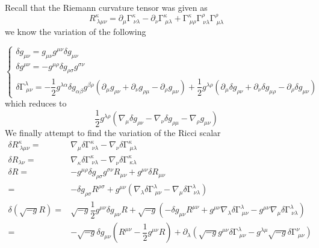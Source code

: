 \begin{recall}
Recall that the Riemann curvature tensor was given as 
\[R^{\kappa }_{\ \lambda \mu \nu }=\partial _{\mu }\mathrm{\Gamma} ^{\kappa }_{\ \nu \lambda }-\partial _{\nu }\mathrm{\Gamma} ^{\kappa }_{\ \mu \lambda }+\mathrm{\Gamma} ^{\kappa }_{\ \mu \rho }\mathrm{\Gamma} ^{\rho }_{\ \nu \lambda }\mathrm{\Gamma} ^{\rho }_{\ \mu \lambda }\]
we know the variation of the following
\begin{spacing}{1.5}
\[\begin{cases}
	\delta g_{\mu \nu }=g_{\mu \nu }g^{\mu \nu }\delta g_{\mu \nu }\\
	\delta g^{\mu \nu }=-g^{\mu \rho }\delta g_{\rho \sigma }g^{\sigma \nu }\\
\delta \mathrm{\Gamma} ^{\lambda }_{\ \mu \nu }=-\dfrac{1}{2}g^{\lambda \alpha }\delta g_{\alpha \beta }g^{\beta \rho }(\partial _{\mu }g_{\rho \nu }+\partial _{\nu }g_{\rho \mu }-\partial _{\rho }g_{\mu \nu })+\dfrac{1}{2}g^{\lambda \rho }(\partial _{\mu }\delta g_{\rho \nu }+\partial _{\nu }\delta g_{\mu \rho }-\partial _{\rho }\delta g_{\mu \nu })
\end{cases}\]
which reduces to
\[\dfrac{1}{2}g^{\lambda \rho }(\nabla _{\mu }\delta g_{\rho \nu }-\nabla _{\nu }\delta g_{\rho \mu }-\nabla _{\rho }g_{\mu \nu })\]
We finally attempt to find the variation of the Ricci scalar
\begin{align*}
	\delta R^{\kappa }_{\ \lambda \mu \nu }=&\nabla _{\mu }\delta \mathrm{\Gamma} ^{\kappa }_{\ \nu \lambda }-\nabla _{\nu }\delta \mathrm{\Gamma} ^{\kappa }_{\ \mu \lambda }\\
	\delta R_{\lambda \nu }=&\nabla _{\kappa }\delta \mathrm{\Gamma} ^{\kappa }_{\ \nu \lambda }-\nabla _{\nu }\delta \mathrm{\Gamma} ^{\kappa }_{\ \kappa \lambda }\\
	\delta R=&-g^{\mu \rho }\delta g_{\rho \sigma }g^{\sigma \nu }R_{\mu \nu }+g^{\mu \nu }\delta R_{\mu \nu }\\
	=&-\delta g_{\rho \sigma }R^{\rho \sigma }+g^{\mu \nu }(\nabla _{\lambda }\delta \mathrm{\Gamma} ^{\lambda }_{\ \mu \nu }-\nabla _{\mu }\delta \mathrm{\Gamma} ^{\lambda }_{\ \nu \lambda })\\
	\delta (\sqrt{-g}R)=&\sqrt{-g}\dfrac{1}{2}g^{\mu \nu }\delta g_{\mu \nu }R+\sqrt{-g}(-\delta g_{\mu \nu }R^{\mu \nu }+g^{\mu \nu }\nabla _{\lambda }\delta \mathrm{\Gamma}^{\lambda }_{\ \mu \nu }-g^{\mu \nu }\nabla _{\mu }\delta \mathrm{\Gamma} ^{\lambda }_{\ \nu \lambda })\\
=&-\sqrt{-g}\delta g_{\mu \nu }(R^{\mu \nu }-\dfrac{1}{2}g^{\mu \nu }R)+\partial _{\lambda }(\sqrt{-g}g^{\mu \nu }\delta \mathrm{\Gamma} ^{\lambda }_{\ \mu \nu }-g^{\lambda \mu }\sqrt{-g}\delta \mathrm{\Gamma} ^{\nu }_{\ \mu \nu })
\end{align*}
\end{spacing}
\end{recall}
